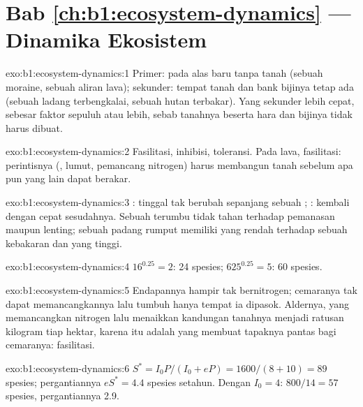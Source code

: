 \section*{Bab \ref{ch:b1:ecosystem-dynamics} --- Dinamika Ekosistem}

\begin{solution}{exo:b1:ecosystem-dynamics:1}
Primer: pada alas baru tanpa tanah (sebuah moraine, sebuah aliran
lava); sekunder: tempat tanah dan bank bijinya tetap ada (sebuah
ladang terbengkalai, sebuah hutan terbakar). Yang sekunder lebih
cepat, sebesar faktor sepuluh atau lebih, sebab tanahnya beserta hara
dan bijinya tidak harus dibuat.
\end{solution}

\begin{solution}{exo:b1:ecosystem-dynamics:2}
Fasilitasi, inhibisi, toleransi. Pada lava, fasilitasi: perintisnya
(, lumut, pemancang nitrogen) harus membangun tanah sebelum
apa pun yang lain dapat berakar.
\end{solution}

\begin{solution}{exo:b1:ecosystem-dynamics:3}
: tinggal tak berubah sepanjang sebuah ; :
kembali dengan cepat sesudahnya. Sebuah terumbu tidak tahan terhadap
pemanasan maupun lenting; sebuah padang rumput memiliki  yang
rendah terhadap sebuah kebakaran dan  yang tinggi.
\end{solution}

\begin{solution}{exo:b1:ecosystem-dynamics:4}
$16^{0.25} = 2$: \num{24} spesies; $625^{0.25} = 5$: \num{60} spesies.
\end{solution}

\begin{solution}{exo:b1:ecosystem-dynamics:5}
Endapannya hampir tak bernitrogen; cemaranya tak dapat memancangkannya
lalu tumbuh hanya tempat ia dipasok. Aldernya, yang memancangkan
nitrogen lalu menaikkan kandungan tanahnya menjadi ratusan kilogram
tiap hektar, karena itu adalah yang membuat tapaknya pantas bagi
cemaranya: fasilitasi.
\end{solution}

\begin{solution}{exo:b1:ecosystem-dynamics:6}
$S^* = I_0 P/(I_0 + eP) = 1600/(8 + 10) = 89$ spesies; pergantiannya
$eS^* = 4.4$ spesies setahun. Dengan $I_0 = 4$: $800/14 = 57$ spesies,
pergantiannya \num{2.9}.
\end{solution}

